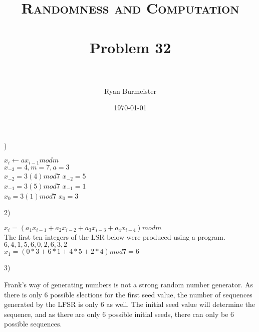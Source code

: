 \documentclass[fontsize=12pt]{article}
\title{ 
  \normalfont \normalsize 
  \textsc{Randomness and Computation} \\ [25pt] %
  \horrule{0.5pt} \\[0.4cm] %
  \huge Problem 32 \\ %
  \horrule{2pt} \\[0.5cm] %
}
\author{Ryan Burmeister} %
\date{\normalsize\today} %
\numberwithin{equation}{section} %
\numberwithin{figure}{section} %
\numberwithin{table}{section} %
\begin{document}
) \\ \begin{center} $x_i \leftarrow ax_{i-1} mod m$ \\ $ x_{-3} = 4, m=7, a=3$ \\
$x_{-2} = 3(4)mod7$ \quad $x_{-2}=5$ \\
$x_{-1} = 3(5)mod7$ \quad $x_{-1}=1$ \\
$x_{0} = 3(1)mod7$ \quad $x_{0}=3$ \end{center}

2) \begin{center} 
$x_i = \left( a_1x_{i-1} + a_2x_{i-2} + a_3x_{i-3} + a_4x_{i-4} \right) mod m$ \\
The first ten integers of the LSR below were produced using a program. \\
$6, 4, 1, 5, 6, 0, 2, 6, 3, 2$ \\
$x_1 = \left(0*3 + 6*1 + 4*5 + 2*4\right) mod 7 = 6$ \end{center}

3) \begin{center}
  Frank's way of generating numbers is not a strong random number generator.
  As there is only 6 possible slections for the first seed value, the number of
  sequences generated by the LFSR is only 6 as well.  The initial seed value
  will determine the sequence, and as there are only 6 possible initial seeds,
  there can only be 6 possible sequences.
\end{center}
\end{document}
